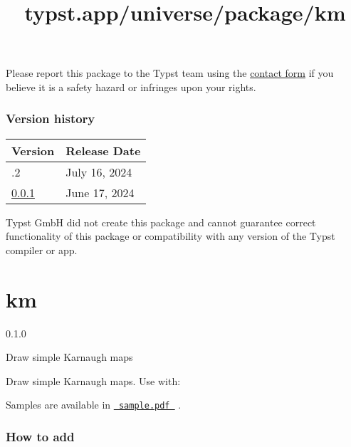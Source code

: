 Please report this package to the Typst team using the
\href{https://typst.app/contact}{contact form} if you believe it is a
safety hazard or infringes upon your rights.

\label{versions}
\subsubsection{Version history}\label{version-history}

\begin{longtable}[]{@{}ll@{}}
\toprule\noalign{}
Version & Release Date \\
\midrule\noalign{}
\endhead
\bottomrule\noalign{}
\endlastfoot
0.0.2 & July 16, 2024 \\
\href{https://typst.app/universe/package/neoplot/0.0.1/}{0.0.1} & June
17, 2024 \\
\end{longtable}

Typst GmbH did not create this package and cannot guarantee correct
functionality of this package or compatibility with any version of the
Typst compiler or app.


\title{typst.app/universe/package/km}

\label{banner}
\section{km}\label{km}

{ 0.1.0 }

Draw simple Karnaugh maps

\label{readme}
Draw simple Karnaugh maps. Use with:

\begin{Shaded}
\begin{Highlighting}[]

\NormalTok{  ),}
\NormalTok{  (}
\NormalTok{  )}
\NormalTok{)}
\end{Highlighting}
\end{Shaded}

Samples are available in
\href{https://github.com/typst/packages/blob/main/packages/preview/km/0.1.0/sample.pdf}{\texttt{\ sample.pdf\ }}
.

\subsubsection{How to add}\label{how-to-add}

